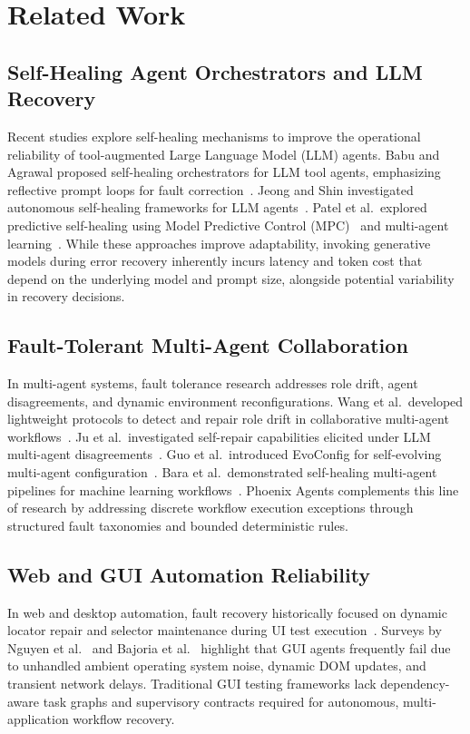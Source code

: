\documentclass[conference]{IEEEtran}
\newcommand{\chg}[1]{{\color{blue}#1}}
\begin{document}
\section{Related Work}

\subsection{Self-Healing Agent Orchestrators and LLM Recovery}
Recent studies explore self-healing mechanisms to improve the operational reliability of tool-augmented Large Language Model (LLM) agents. Babu and Agrawal proposed self-healing orchestrators for LLM tool agents, emphasizing reflective prompt loops for fault correction~\cite{babu2026}. Jeong and Shin investigated autonomous self-healing frameworks for LLM agents~\cite{jeong2026}. Patel et al.\ explored predictive self-healing using Model Predictive Control (MPC)~\cite{patel2026a} and multi-agent learning~\cite{patel2026b}. While these approaches improve adaptability, \chg{invoking generative models during error recovery inherently incurs latency and token cost that depend on the underlying model and prompt size, alongside potential variability in recovery decisions.}

\subsection{Fault-Tolerant Multi-Agent Collaboration}
In multi-agent systems, fault tolerance research addresses role drift, agent disagreements, and dynamic environment reconfigurations. Wang et al.\ developed lightweight protocols to detect and repair role drift in collaborative multi-agent workflows~\cite{wang2026}. Ju et al.\ investigated self-repair capabilities elicited under LLM multi-agent disagreements~\cite{ju2025}. Guo et al.\ introduced EvoConfig for self-evolving multi-agent configuration~\cite{guo2026}. Bara et al.\ demonstrated self-healing multi-agent pipelines for machine learning workflows~\cite{bara2026}. Phoenix Agents complements this line of research by addressing discrete workflow execution exceptions through structured fault taxonomies and bounded deterministic rules.

\subsection{Web and GUI Automation Reliability}
In web and desktop automation, fault recovery historically focused on dynamic locator repair and selector maintenance during UI test execution~\cite{garcia2026}. Surveys by Nguyen et al.~\cite{nguyen2025} and Bajoria et al.~\cite{bajoria2026} highlight that GUI agents frequently fail due to unhandled ambient operating system noise, dynamic DOM updates, and transient network delays. Traditional GUI testing frameworks lack dependency-aware task graphs and supervisory contracts required for autonomous, multi-application workflow recovery.
\end{document}
